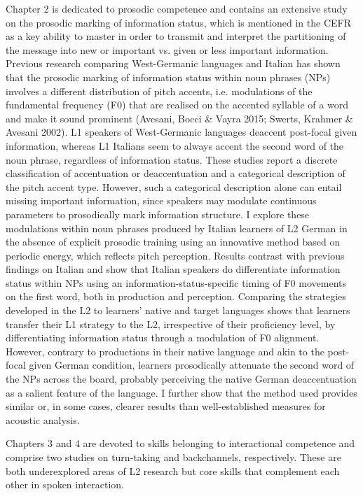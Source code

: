 \begin{styleStandard}
Chapter 2 is dedicated to prosodic competence and contains an extensive study on the prosodic marking of information status, which is mentioned in the CEFR as a key ability to master in order to transmit and interpret the partitioning of the message into new or important vs. given or less important information. Previous research comparing West-Germanic languages and Italian has shown that the prosodic marking of information status within noun phrases (NPs) involves a different distribution of pitch accents, i.e. modulations of the fundamental frequency (F0) that are realised on the accented syllable of a word and make it sound prominent (Avesani, Bocci \& Vayra 2015; Swerts, Krahmer \& Avesani 2002). L1 speakers of West-Germanic languages deaccent post-focal given information, whereas L1 Italians seem to always accent the second word of the noun phrase, regardless of information status. These studies report a discrete classification of accentuation or deaccentuation and a categorical description of the pitch accent type. However, such a categorical description alone can entail missing important information, since speakers may modulate continuous parameters to prosodically mark information structure. I explore these modulations within noun phrases produced by Italian learners of L2 German in the absence of explicit prosodic training using an innovative method based on periodic energy, which reflects pitch perception. Results contrast with previous findings on Italian and show that Italian speakers do differentiate information status within NPs using an information-status-specific timing of F0 movements on the first word, both in production and perception. Comparing the strategies developed in the L2 to learners’ native and target languages shows that learners transfer their L1 strategy to the L2, irrespective of their proficiency level, by differentiating information status through a modulation of F0 alignment. However, contrary to productions in their native language and akin to the post-focal given German condition, learners prosodically attenuate the second word of the NPs across the board, probably perceiving the native German deaccentuation as a salient feature of the language. I further show that the method used provides similar or, in some cases, clearer results than well-established measures for acoustic analysis.
\end{styleStandard}

\begin{styleStandard}
Chapters 3 and 4 are devoted to skills belonging to interactional competence and comprise two studies on turn-taking and backchannels, respectively. These are both underexplored areas of L2 research but core skills that complement each other in spoken interaction.
\end{styleStandard}

